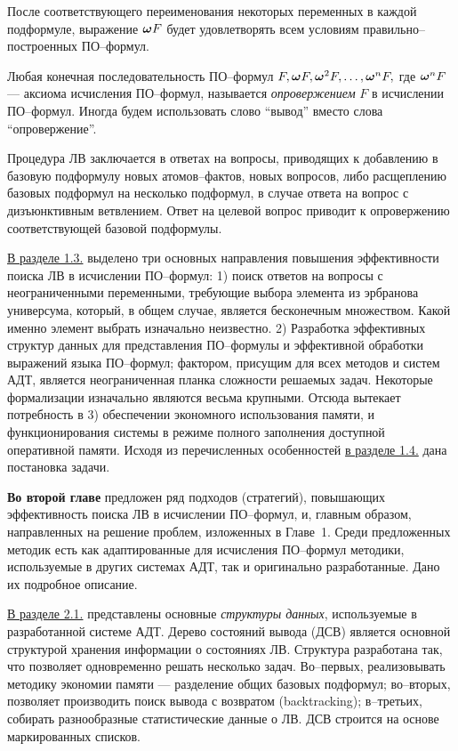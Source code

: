 \documentclass[a4paper]{report}
\begin{document}
После соответствующего переименования некоторых переменных в каждой подформуле, выражение $\boldsymbol{\omega} F$ будет удовлетворять всем условиям правильно--построенных ПО--формул.

Любая конечная последовательность ПО--формул $F, \boldsymbol{\omega} F, \boldsymbol{\omega}^2 F,\ldots,\boldsymbol{\omega}^n F,$ где $\boldsymbol{\omega}^n F$ --- аксиома исчисления ПО--формул, называется {\em опровержением} $F$ в исчислении ПО--формул. Иногда будем использовать слово ``вывод'' вместо слова ``опровержение''.

Процедура ЛВ заключается в ответах на вопросы, приводящих к добавлению в базовую подформулу новых атомов--фактов, новых вопросов, либо расщеплению базовых подформул на несколько подформул, в случае ответа на вопрос с дизъюнктивным ветвлением. Ответ на целевой вопрос приводит к опровержению соответствующей базовой подформулы.


\underline{В разделе 1.3.} выделено три основных направления повышения эффективности поиска ЛВ в исчислении ПО--формул: 1) поиск ответов на вопросы с неограниченными переменными, требующие выбора элемента из эрбранова универсума, который, в общем случае, является бесконечным множеством. Какой именно элемент выбрать изначально неизвестно. 2) Разработка эффективных структур данных для представления ПО--формулы и эффективной обработки выражений языка ПО--формул; фактором, присущим для всех методов и систем АДТ, является неограниченная планка сложности решаемых задач. Некоторые формализации изначально являются весьма крупными. Отсюда вытекает потребность в 3) обеспечении экономного использования памяти, и функционирования системы в режиме полного заполнения доступной оперативной памяти. Исходя из перечисленных особенностей \underline{в разделе 1.4.} дана постановка задачи.

\textbf{Во второй главе} предложен ряд подходов (стратегий), повышающих эффективность поиска ЛВ в исчислении ПО--формул, и, главным образом, направленных на решение проблем, изложенных в Главе~1. Среди предложенных методик есть как адаптированные для исчисления ПО--формул методики, используемые в других системах АДТ, так и оригинально разработанные. Дано их подробное описание.

\underline{В разделе 2.1.} представлены основные \emph{структуры данных}, используемые в разработанной системе АДТ. Дерево состояний вывода (ДСВ) является основной структурой хранения информации о состояниях ЛВ. Структура разработана так, что позволяет одновременно решать несколько задач. Во--первых, реализовывать методику экономии памяти --- разделение общих базовых подформул; во--вторых, позволяет производить поиск вывода с возвратом (backtracking); в--третьих, собирать разнообразные статистические данные о ЛВ. ДСВ строится на основе маркированных списков.
\end{document}
